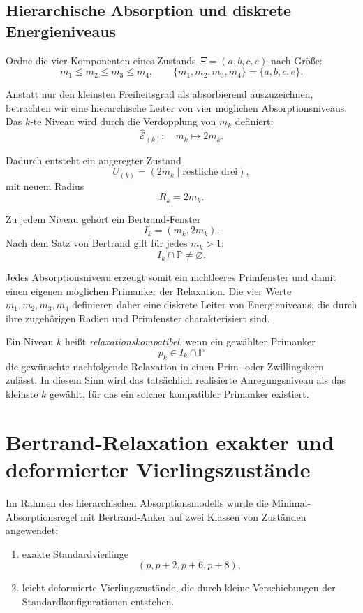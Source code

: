 \documentclass[11pt,a4paper]{article}
\theoremstyle{definition}
\theoremstyle{plain}
\theoremstyle{remark}
\begin{document}
	\subsection{Hierarchische Absorption und diskrete Energieniveaus}
	
	Ordne die vier Komponenten eines Zustands \(\Xi=(a,b,c,e)\) nach Größe:
	\[
	m_1 \le m_2 \le m_3 \le m_4,
	\qquad
	\{m_1,m_2,m_3,m_4\}=\{a,b,c,e\}.
	\]
	
	Anstatt nur den kleinsten Freiheitsgrad als absorbierend auszuzeichnen, betrachten wir eine hierarchische Leiter von vier möglichen Absorptionsniveaus. 
	Das \(k\)-te Niveau wird durch die Verdopplung von \(m_k\) definiert:
	\[
	\hat{\mathcal E}_{(k)}:\quad m_k \mapsto 2m_k.
	\]
	
	Dadurch entsteht ein angeregter Zustand
	\[
	U_{(k)}=(2m_k \mid \text{restliche drei}),
	\]
	mit neuem Radius
	\[
	R_k=2m_k.
	\]
	
	Zu jedem Niveau gehört ein Bertrand-Fenster
	\[
	I_k=(m_k,2m_k).
	\]
	Nach dem Satz von Bertrand gilt für jedes \(m_k>1\):
	\[
	I_k\cap\mathbb P \neq \varnothing.
	\]
	
	Jedes Absorptionsniveau erzeugt somit ein nichtleeres Primfenster und damit einen eigenen möglichen Primanker der Relaxation. 
	Die vier Werte \(m_1,m_2,m_3,m_4\) definieren daher eine diskrete Leiter von Energieniveaus, die durch ihre zugehörigen Radien und Primfenster charakterisiert sind.
	
	Ein Niveau \(k\) heißt \emph{relaxationskompatibel}, wenn ein gewählter Primanker
	\[
	p_k\in I_k\cap\mathbb P
	\]
	die gewünschte nachfolgende Relaxation in einen Prim- oder Zwillingskern zulässt. 
	In diesem Sinn wird das tatsächlich realisierte Anregungsniveau als das kleinste \(k\) gewählt, für das ein solcher kompatibler Primanker existiert.
	
	\section{Bertrand-Relaxation exakter und deformierter Vierlingszustände}
	
	Im Rahmen des hierarchischen Absorptionsmodells wurde die Minimal-Absorptionsregel mit Bertrand-Anker auf zwei Klassen von Zuständen angewendet:
	
	\begin{enumerate}
		\item exakte Standardvierlinge
		\[
		(p,p+2,p+6,p+8),
		\]
		\item leicht deformierte Vierlingszustände, die durch kleine Verschiebungen der Standardkonfigurationen entstehen.
	\end{enumerate}
	
\end{document}
